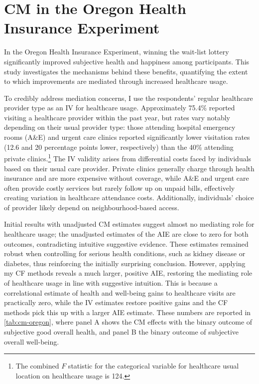 \section{CM in the Oregon Health Insurance Experiment}
\label{sec:oregon}
In the Oregon Health Insurance Experiment, winning the wait-list lottery significantly improved subjective health and happiness among participants. 
This study investigates the mechanisms behind these benefits, quantifying the extent to which improvements are mediated through increased healthcare usage.

To credibly address mediation concerns, I use the respondents' regular healthcare provider type as an IV for healthcare usage.
Approximately 75.4\% reported visiting a healthcare provider within the past year, but rates vary notably depending on their usual provider type: those attending hospital emergency rooms (A\&E) and urgent care clinics reported significantly lower visitation rates (12.6 and 20 percentage points lower, respectively) than the 40\% attending private clinics.\footnote{
    The combined $F$ statistic for the categorical variable for healthcare usual location on healthcare usage is 124.
}
The IV validity arises from differential costs faced by individuals based on their usual care provider.
Private clinics generally charge through health insurance and are more expensive without coverage, while A\&E and urgent care often provide costly services but rarely follow up on unpaid bills, effectively creating variation in healthcare attendance costs.
Additionally, individuals' choice of provider likely depend on neighbourhood-based access.

Initial results with unadjusted CM estimates suggest almost no mediating role for healthcare usage; the unadjusted estimates of the AIE are close to zero for both outcomes, contradicting intuitive suggestive evidence.
These estimates remained robust when controlling for serious health conditions, such as kidney disease or diabetes, thus reinforcing the initially surprising conclusion.
However, applying my CF methods reveals a much larger, positive AIE, restoring the mediating role of healthcare usage in line with suggestive intuition.
This is because a correlational estimate of health and well-being gains to healthcare visits are practically zero, while the IV estimates restore positive gains and the CF methods pick this up with a larger AIE estimate.
These numbers are reported in \autoref{tab:cm-oregon}, where panel A shows the CM effects with the binary outcome of subjective good overall health, and panel B the binary outcome of subjective overall well-being.

